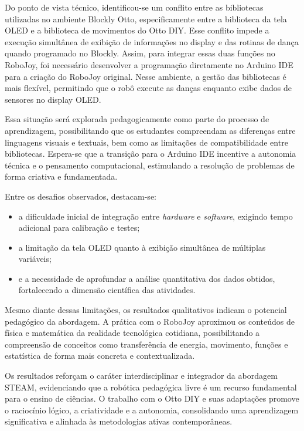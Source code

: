 \documentclass[portuguese]{textolivre}
\begin{document}
Do ponto de vista técnico, identificou-se um conflito entre as bibliotecas utilizadas no ambiente Blockly Otto, especificamente entre a biblioteca da tela OLED e a biblioteca de movimentos do Otto DIY. Esse conflito impede a execução simultânea de exibição de informações no display e das rotinas de dança quando programado no Blockly. Assim, para integrar essas duas funções no RoboJoy, foi necessário desenvolver a programação diretamente no Arduino IDE para a criação do RoboJoy original. Nesse ambiente, a gestão das bibliotecas é mais flexível, permitindo que o robô execute as danças enquanto exibe dados de sensores no display OLED.

Essa situação será explorada pedagogicamente como parte do processo de aprendizagem, possibilitando que os estudantes compreendam as diferenças entre linguagens visuais e textuais, bem como as limitações de compatibilidade entre bibliotecas. Espera-se que a transição para o Arduino IDE incentive a autonomia técnica e o pensamento computacional, estimulando a resolução de problemas de forma criativa e fundamentada.

Entre os desafios observados, destacam-se:
\begin{itemize}
	\item a dificuldade inicial de integração entre \textit{hardware} e \textit{software}, exigindo tempo adicional para calibração e testes;
	\item a limitação da tela OLED quanto à exibição simultânea de múltiplas variáveis;
	\item e a necessidade de aprofundar a análise quantitativa dos dados obtidos, fortalecendo a dimensão científica das atividades.
\end{itemize}

Mesmo diante dessas limitações, os resultados qualitativos indicam o potencial pedagógico da abordagem. A prática com o RoboJoy aproximou os conteúdos de física e matemática da realidade tecnológica cotidiana, possibilitando a compreensão de conceitos como transferência de energia, movimento, funções e estatística de forma mais concreta e contextualizada.

Os resultados reforçam o caráter interdisciplinar e integrador da abordagem STEAM, evidenciando que a robótica pedagógica livre é um recurso fundamental para o ensino de ciências. O trabalho com o Otto DIY e suas adaptações promove o raciocínio lógico, a criatividade e a autonomia, consolidando uma aprendizagem significativa e alinhada às metodologias ativas contemporâneas.
\end{document}
